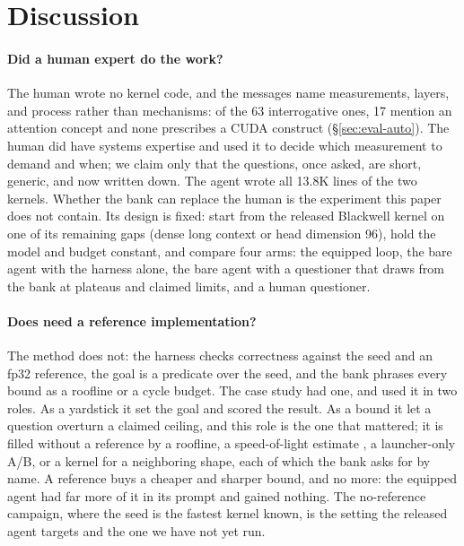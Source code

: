 \section{Discussion}
\label{sec:discussion}

\paragraph{Did a human expert do the work?} The human wrote no kernel code, and the messages name
measurements, layers, and process rather than mechanisms: of the 63 interrogative ones, 17 mention an
attention concept and none prescribes a CUDA construct (\S\ref{sec:eval-auto}). The human did have systems
expertise and used it to decide which measurement to demand and when; we claim only that the
questions, once asked, are short, generic, and now written down. The agent wrote all 13.8K lines of
the two kernels.
Whether the bank can replace the human is the experiment this paper does not contain. Its design is
fixed: start from the released Blackwell kernel on one of its remaining gaps (dense long context or
head dimension 96), hold the model and budget constant, and compare four arms: the equipped loop,
the bare agent with the harness alone, the bare agent with a questioner that draws from the bank at
plateaus and claimed limits, and a human questioner.

\paragraph{Does \sys need a reference implementation?} The method does not: the harness checks
correctness against the seed and an fp32 reference, the goal is a predicate over the seed, and the
bank phrases every bound as a roofline or a cycle budget. The case study had one, and used it in two
roles. As a yardstick it set the goal and scored the result. As a bound it let a question overturn a
claimed ceiling, and this role is the one that mattered; it is filled without a reference by a
roofline, a speed-of-light estimate \cite{lin2026solexecbench}, a launcher-only A/B, or a kernel for
a neighboring shape, each of which the bank asks for by name. A reference buys a cheaper and sharper
bound, and no more: the equipped agent had far more of it in its prompt and gained nothing. The
no-reference campaign, where the seed is the fastest kernel known, is the setting the released agent
targets and the one we have not yet run.

